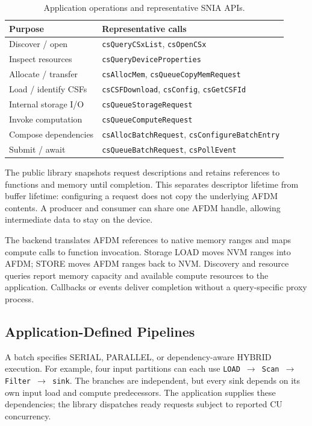 \documentclass[sigconf, nonacm]{acmart}
\begin{document}
\begin{table}[t]
\caption{Application operations and representative SNIA APIs.}
\label{tab:api}
\small
\begin{tabular}{@{}p{}p{}@{}}
\toprule
Purpose & Representative calls \\
\midrule
Discover / open & \texttt{csQueryCSxList}, \texttt{csOpenCSx} \\
Inspect resources & \texttt{csQueryDeviceProperties} \\
Allocate / transfer & \texttt{csAllocMem}, \texttt{csQueueCopyMemRequest} \\
Load / identify CSFs & \texttt{csCSFDownload}, \texttt{csConfig}, \texttt{csGetCSFId} \\
Internal storage I/O & \texttt{csQueueStorageRequest} \\
Invoke computation & \texttt{csQueueComputeRequest} \\
Compose dependencies & \texttt{csAllocBatchRequest}, \texttt{csConfigureBatchEntry} \\
Submit / await & \texttt{csQueueBatchRequest}, \texttt{csPollEvent} \\
\bottomrule
\end{tabular}
\end{table}

The public library snapshots request descriptions and retains references to
functions and memory until completion. This separates descriptor lifetime
from buffer lifetime: configuring a request does not copy the underlying
AFDM contents. A producer and consumer can share one AFDM handle, allowing
intermediate data to stay on the device.

The backend translates AFDM references to native memory ranges and maps
compute calls to function invocation. Storage LOAD moves NVM ranges into
AFDM; STORE moves AFDM ranges back to NVM. Discovery and resource queries
report memory capacity and available compute resources to the application.
Callbacks or events deliver completion without a query-specific proxy process.

\subsection{Application-Defined Pipelines}
A batch specifies SERIAL, PARALLEL, or dependency-aware HYBRID execution.
For example, four input partitions can each use
\texttt{LOAD $\rightarrow$ Scan $\rightarrow$ Filter $\rightarrow$ sink}.
The branches are independent, but every sink depends on its own input load
and compute predecessors. The application supplies these dependencies;
the library dispatches ready requests subject to reported CU concurrency.
\end{document}

